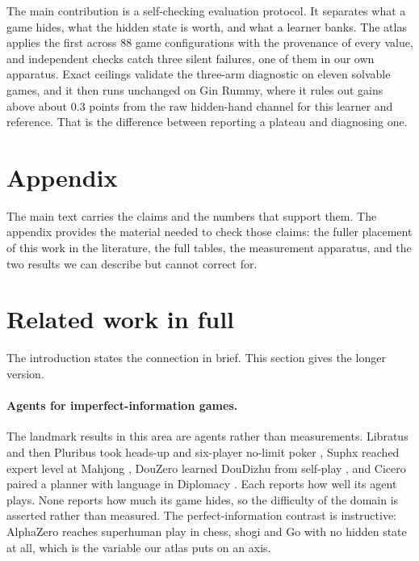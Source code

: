 \documentclass{article}
\begin{document}
The main contribution is a self-checking evaluation protocol. It separates what a game hides, what the hidden state is worth, and what a learner banks. The atlas applies the first across 88 game configurations with the provenance of every value, and independent checks catch three silent failures, one of them in our own apparatus. Exact ceilings validate the three-arm diagnostic on eleven solvable games, and it then runs unchanged on Gin Rummy, where it rules out gains above about $0.3$ points from the raw hidden-hand channel for this learner and reference. That is the difference between reporting a plateau and diagnosing one.




\appendix
\section*{Appendix}

The main text carries the claims and the numbers that support them. The appendix provides the material needed to check those claims: the fuller placement of this work in the literature, the full tables, the measurement apparatus, and the two results we can describe but cannot correct for.

\section{Related work in full}
\label{app:related}

The introduction states the connection in brief. This section gives the longer version.

\paragraph{Agents for imperfect-information games.} The landmark results in this area are agents rather than measurements. Libratus and then Pluribus took heads-up and six-player no-limit poker \citep{libratus,pluribus}, Suphx reached expert level at Mahjong \citep{suphx}, DouZero learned DouDizhu from self-play \citep{douzero}, and Cicero paired a planner with language in Diplomacy \citep{cicero}. Each reports how well its agent plays. None reports how much its game hides, so the difficulty of the domain is asserted rather than measured. The perfect-information contrast is instructive: AlphaZero \citep{alphazero} reaches superhuman play in chess, shogi and Go with no hidden state at all, which is the variable our atlas puts on an axis.
\end{document}

